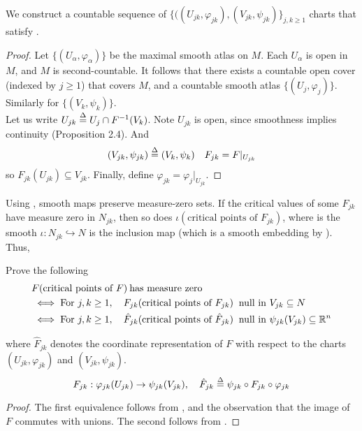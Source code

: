 \documentclass[../main-manifolds.tex]{subfiles}
\begin{document}
\begin{step}\label{lee-sards-construction-charts}
    We construct a countable sequence of $\{((U_{jk}, \varphi_{jk}),(V_{jk},\psi_{jk})\}_{j,k\geq 1}$ charts that satisfy .
\end{step}
\begin{proof}
    Let $\{(U_\alpha, \varphi_\alpha)\}$ be the maximal smooth atlas on $M$. Each $U_\alpha$ is open in $M$, and $M$ is second-countable. It follows that there exists a countable open cover (indexed by $j\geq 1$) that covers $M$, and a countable smooth atlas $\{(U_j, \varphi_j)\}$. Similarly for $\{(V_k,\psi_k)\}$.\\

    Let us write $U_{jk}\overset{\Delta}{=} U_j\cap F^{-1}(V_k)$. Note $U_{jk}$ is open, since smoothness implies continuity (Proposition 2.4). And
    \[
        (V_{jk}, \psi_{jk})\overset{\Delta}{=} (V_k, \psi_k)\quad F_{jk}=F|_{U_{jk}}
    \]
    so $F_{jk}(U_{jk})\subseteq V_{jk}$. Finally, define $\varphi_{jk}=\varphi_j|_{U_{jk}}$.
\end{proof}

Using , smooth maps preserve measure-zero sets. If the critical values of some $F_{jk}$ have measure zero in $N_{jk}$, then so does $\iota(\text{critical points of } F_{jk})$, where is the smooth $\iota: N_{jk}\hookrightarrow N$ is the inclusion map (which is a smooth embedding by ). Thus,

\begin{step}
    Prove the following
    \begin{align*}
    &F(\text{critical points of } F)\: \text{has measure zero}
    \\ &\iff
    \text{For } j,k\geq 1,\quad F_{jk}(\text{critical points of }F_{jk})\:\text{ null in } V_{jk}\subseteq N
    \\&\iff 
    \text{For } j,k\geq 1,\quad \hat{F}_{jk}(\text{critical points of }\hat{F}_{jk})\:\text{ null in } \psi_{jk}(V_{jk})\subseteq {\mathbb{R}^n}
\end{align*}

where $\hat{F}_{jk}$ denotes the coordinate representation of $F$ with respect to the charts $(U_{jk}, \varphi_{jk})$ and $(V_{jk},\psi_{jk})$.
\begin{equation}
    F_{jk}:\varphi_{jk}(U_{jk})\to \psi_{jk}(V_{jk}),\quad \hat{F}_{jk}\overset{\Delta}{=} \psi_{jk}\circ F_{jk}\circ \varphi_{jk}
\end{equation}
\end{step}
\begin{proof}
    The first equivalence follows from , and the observation that the image of $F$ commutes with unions. The second follows from .
\end{proof}
\end{document}
